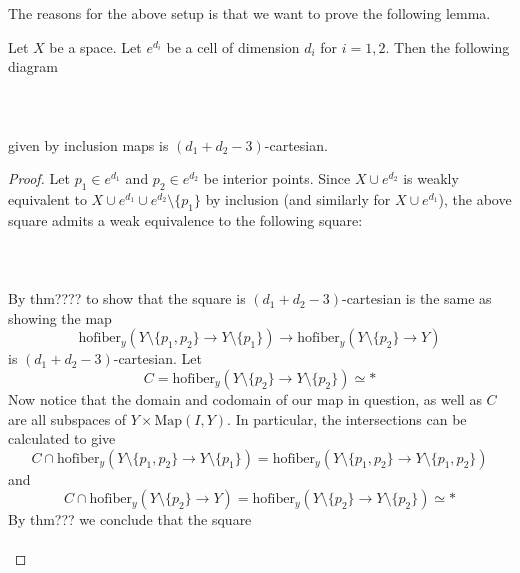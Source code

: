 \documentclass[a4paper]{article}
\begin{document}
The reasons for the above setup is that we want to prove the following lemma. 

\begin{lmm}{}{} Let $X$ be a space. Let $e^{d_i}$ be a cell of dimension $d_i$ for $i=1,2$. Then the following diagram \\~\\
\\~\\
given by inclusion maps is $(d_1+d_2-3)$-cartesian. \tcbline
\begin{proof}
Let $p_1\in e^{d_1}$ and $p_2\in e^{d_2}$ be interior points. Since $X\cup e^{d_2}$ is weakly equivalent to $X\cup e^{d_1}\cup e^{d_2}\setminus\{p_1\}$ by inclusion (and similarly for $X\cup e^{d_1}$), the above square admits a weak equivalence to the following square: \\~\\
\\~\\
By thm???? to show that the square is $(d_1+d_2-3)$-cartesian is the same as showing the map $$\text{hofiber}_y(Y\setminus\{p_1,p_2\}\to Y\setminus\{p_1\})\to\text{hofiber}_y(Y\setminus\{p_2\}\to Y)$$ is $(d_1+d_2-3)$-cartesian. Let $$C=\text{hofiber}_y(Y\setminus\{p_2\}\to Y\setminus\{p_2\})\simeq\ast$$ Now notice that the domain and codomain of our map in question, as well as $C$ are all subspaces of $Y\times\text{Map}(I,Y)$. In particular, the intersections can be calculated to give $$C\cap\text{hofiber}_y(Y\setminus\{p_1,p_2\}\to Y\setminus\{p_1\})=\text{hofiber}_y(Y\setminus\{p_1,p_2\}\to Y\setminus\{p_1,p_2\})$$ and $$C\cap\text{hofiber}_y(Y\setminus\{p_2\}\to Y)=\text{hofiber}_y(Y\setminus\{p_2\}\to Y\setminus\{p_2\})\simeq\ast$$ By thm??? we conclude that the square \\~\\

\end{proof}
\end{lmm}
\end{document}
